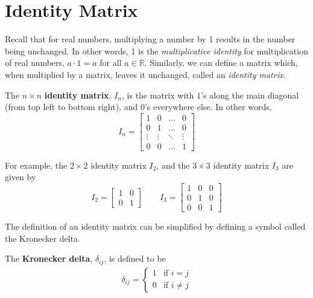 \documentclass[letterpaper,12pt]{article}
\begin{document}
\section*{Identity Matrix}
Recall that for real numbers, multiplying a number by 1 results in the number being unchanged. In other words, 1 is the \textit{multiplicative identity} for multiplication of real numbers, $a \cdot 1 = a$ for all $a \in \mathbb{R}$. Similarly, we can define a matrix which, when multiplied by a matrix, leaves it unchanged, called an \textit{identity matrix}.

\begin{definition}
The $n \times n$ \textbf{identity matrix}, $I_n$, is the matrix with $1$'s along the main diagonal (from top left to bottom right), and $0$'s everywhere else. In other words,
\begin{equation*}
    I_n = \begin{bmatrix} 1 & 0 & \dots & 0 \\ 0 & 1 & \dots & 0 \\ \vdots & \vdots & \ddots & \vdots \\ 0 & 0 & \dots & 1 \end{bmatrix}
\end{equation*}
\end{definition}

For example, the $2 \times 2$ identity matrix $I_2$, and the $3 \times 3$ identity matrix $I_3$ are given by
\begin{equation*}
    I_2 = \begin{bmatrix} 1 & 0 \\ 0 & 1 \end{bmatrix} \qquad I_3 = \begin{bmatrix} 1 & 0 & 0 \\ 0 & 1 & 0 \\ 0 & 0 & 1 \end{bmatrix}
\end{equation*}

The definition of an identity matrix can be simplified by defining a symbol called the Kronecker delta. 

\begin{definition}
The \textbf{Kronecker delta}, $\delta_{ij}$, is defined to be
\begin{align*}
    \delta_{ij} = \begin{cases} 1 & \text{if $i = j$} \\ 0 & \text{if $i \neq j$} \end{cases}
\end{align*}
\end{definition}
\end{document}
